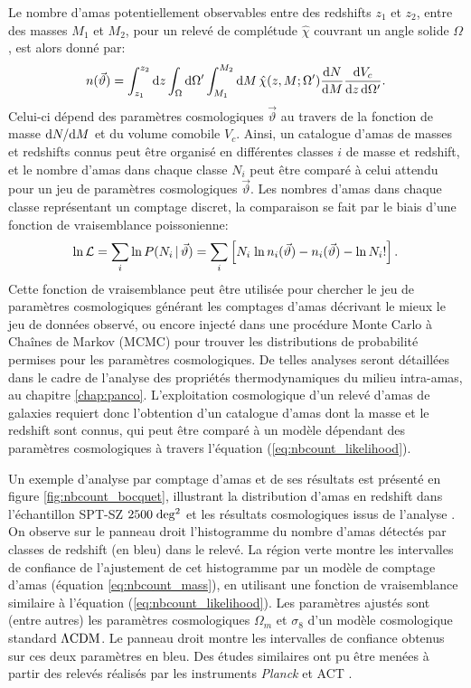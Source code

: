 Le nombre d'amas potentiellement observables entre des redshifts $z_1$ et $z_2$, entre des masses $M_1$ et $M_2$, pour un relevé de complétude $\hat{\chi}$ couvrant un angle solide $\Omega$, est alors donné par:
\begin{equation}
    \label{eq:nbcount_mass}
    n(\vec{\vartheta})
    = \int_{z_1}^{z_2} \mathrm{d} z
      \int_\Omega \mathrm{d}\Omega'
      \int_{M_1}^{M_2} \mathrm{d} M \,
        \hat{\chi}(z, M; \Omega') \frac{\mathrm{d} N}{\mathrm{d} M} \frac{\mathrm{d} V_c}{\mathrm{d} z \, \mathrm{d}\Omega'}.
\end{equation}
Celui-ci dépend des paramètres cosmologiques $\vec{\vartheta}$ au travers de la fonction de masse $\mathrm{d} N / \mathrm{d} M$ et du volume comobile $V_c$.
Ainsi, un catalogue d'amas de masses et redshifts connus peut être organisé en différentes classes $i$ de masse et redshift, et le nombre d'amas dans chaque classe $N_i$ peut être comparé à celui attendu pour un jeu de paramètres cosmologiques $\vec{\vartheta}$.
Les nombres d'amas dans chaque classe représentant un comptage discret, la comparaison se fait par le biais d'une fonction de vraisemblance poissonienne:
\begin{equation}
    \label{eq:nbcount_likelihood}
    {\rm ln}\, \mathcal{L}
    = \sum_i {\rm ln}\, P(N_i \,|\, \vec{\vartheta})
    = \sum_i \left[N_i \; {\rm ln}\, n_i(\vec{\vartheta}) - n_i(\vec{\vartheta}) - {\rm ln}\, N_i! \right].
\end{equation}
Cette fonction de vraisemblance peut être utilisée pour chercher le jeu de paramètres cosmologiques générant les comptages d'amas décrivant le mieux le jeu de données observé, ou encore injecté dans une procédure Monte Carlo à Chaînes de Markov (MCMC) pour trouver les distributions de probabilité permises pour les paramètres cosmologiques.
De telles analyses seront détaillées dans le cadre de l'analyse des propriétés thermodynamiques du milieu intra-amas, au chapitre \ref{chap:panco}.
L'exploitation cosmologique d'un relevé d'amas de galaxies requiert donc l'obtention d'un catalogue d'amas dont la masse et le redshift sont connus, qui peut être comparé à un modèle dépendant des paramètres cosmologiques à travers l'équation (\ref{eq:nbcount_likelihood}).

Un exemple d'analyse par comptage d'amas et de ses résultats est présenté en figure \ref{fig:nbcount_bocquet}, illustrant la distribution d'amas en redshift dans l'échantillon SPT-SZ $2500 \;{\rm deg^2}$ \cite{bleem_galaxy_2015} et les résultats cosmologiques issus de l'analyse \cite{bocquet_cluster_2019}.
On observe sur le panneau droit l'histogramme du nombre d'amas détectés par classes de redshift (en bleu) dans le relevé.
La région verte montre les intervalles de confiance de l'ajustement de cet histogramme par un modèle de comptage d'amas (équation \ref{eq:nbcount_mass}), en utilisant une fonction de vraisemblance similaire à l'équation (\ref{eq:nbcount_likelihood}).
Les paramètres ajustés sont (entre autres) les paramètres cosmologiques $\Omega_m$ et $\sigma_8$ d'un modèle cosmologique standard $\Lambda{\rm CDM}$.
Le panneau droit montre les intervalles de confiance obtenus sur ces deux paramètres en bleu.
Des études similaires ont pu être menées à partir des relevés réalisés par les instruments \textit{Planck} \cite{planck_collaboration_planck_2016-1} et ACT \cite{hilton_atacama_2021}.

